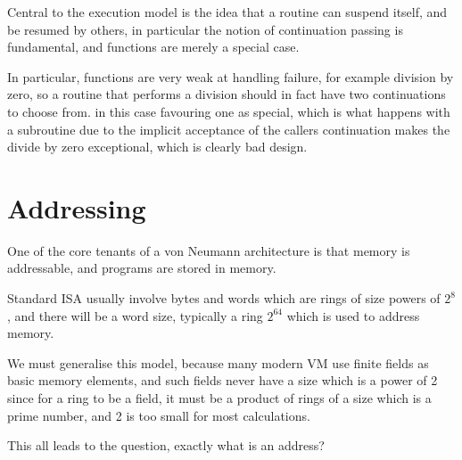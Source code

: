 \documentclass[oneside]{book}
\theoremstyle{plain}
\theoremstyle{definition}
\theoremstyle{plain}
\begin{document}
Central to the execution model is the idea that a routine can suspend itself,
and be resumed by others, in particular the notion of continuation passing
is fundamental, and functions are merely a special case.

In particular, functions are very weak at handling failure, for example
division by zero, so a routine that performs a division should in fact
have two continuations to choose from.  in this case favouring one
as special, which is what happens with a subroutine due to the implicit
acceptance of the callers continuation makes the divide by zero exceptional,
which is clearly bad design.

\chapter{Addressing}
One of the core tenants of a von Neumann architecture is that memory is
addressable, and programs are stored in memory.

Standard ISA usually involve bytes and words which are rings of size powers of $2^8$,
and there will be a word size, typically a ring $2^64$ which is used to address memory.

We must generalise this model, because many modern VM use finite fields as basic
memory elements, and such fields never have a size which is a power of 2 since
for a ring to be a field, it must be a product of rings of a size which is a prime number,
and 2 is too small for most calculations.

This all leads to the question, exactly what is an address?
\end{document}
